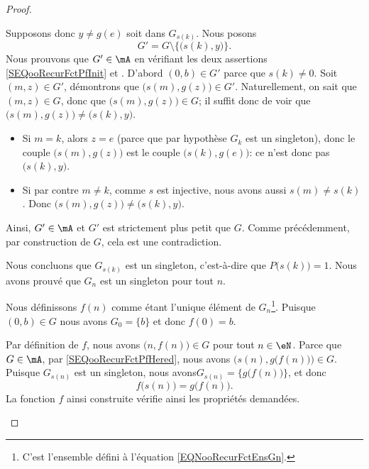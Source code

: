 \begin{proof}
\begin{subproof}
\begin{subproof}
			Supposons donc \( y\neq g(e)\) soit dans \( G_{s(k)}\). Nous posons
			\begin{equation}
				G'=G\setminus\{ \big( s(k),y \big) \}.
			\end{equation}
			Nous prouvons que \( G'\in\mA\) en vérifiant les deux assertions \eqref{SEQooRecurFctPfInit} et \label{SEQooRecurFctPfHered}. D'abord \( (0,b)\in G'\) parce que \( s(k)\neq 0\). Soit \( (m,z)\in G'\), démontrons que \( \big( s(m),g(z) \big)\in G'\). Naturellement, on sait que \( (m,z)\in G\), donc que \( \big( s(m),g(z) \big)\in G\); il suffit donc de voir que \( \big( s(m),g(z) \big) \neq \big( s(k),y \big) \).
   			\begin{itemize}
	  			\item
   					 Si \( m=k\), alors \( z=e\) (parce que par hypothèse \( G_k\) est un singleton), donc le couple \( \big( s(m),g(z) \big) \) est le couple  \( \big( s(k),g(e) \big) \): ce n'est donc pas \(\big( s(k),y \big) \).
				\item
					 Si par contre \( m\neq k\), comme  \( s\) est injective, nous avons aussi \( s(m)\neq s(k)\). Donc \( \big( s(m),g(z) \big) \neq \big( s(k),y \big) \).
	  		\end{itemize}
	 		Ainsi, \( G'\in \mA\) et \( G' \) est strictement plus petit que \( G\). Comme précédemment, par construction de \( G \), cela est une contradiction.

			Nous concluons que \( G_{s(k)}\) est un singleton, c'est-à-dire que \( P\big( s(k) \big)=1\).
			\spitem[Conclusion]
			Nous avons prouvé que \( G_n\) est un singleton pour tout \( n\).
		\end{subproof}

		Nous définissons \( f(n)\) comme étant l'unique élément de \( G_n\)\footnote{C'est l'ensemble défini à l'équation \eqref{EQNooRecurFctEnsGn}.}. Puisque \( (0,b)\in G\) nous avons \( G_0=\{ b \}\) et donc \( f(0)=b\).

		Par définition de \( f\), nous avons \( \big( n,f(n) \big)\in G\) pour tout \(n \in \eN\). Parce que \( G\in\mA\), par \eqref{SEQooRecurFctPfHered}, nous avons \( \Big( s(n),g\big( f(n) \big) \Big)\in G \).
		Puisque \( G_{s(n)} \) est un singleton, nous avons\( G_{s(n)} = \{  g\big( f(n) \big) \}\), et donc
		\begin{equation}
			f\big( s(n) \big)=g\big( f(n) \big).
		\end{equation}
		La fonction \( f\) ainsi construite vérifie ainsi les propriétés demandées.
	\end{subproof}
\end{proof}


